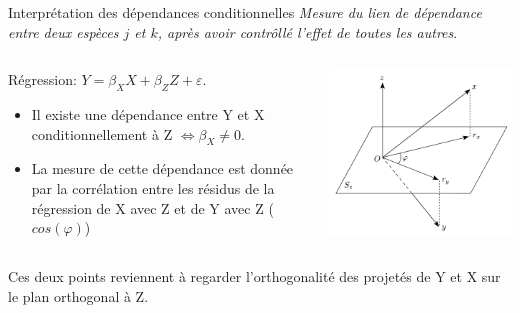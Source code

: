 \documentclass[11pt]{beamer}
\newcommand{\emphase}[1]{\textcolor{Complement}{#1}}
\newcommand{\bleu}[1]{\textcolor{Framableulight}{#1}}
\begin{document}
\begin{frame}{Interprétation des dépendances conditionnelles}
\textit{Mesure du lien de dépendance entre deux espèces $j$ et $k$, \emphase{après avoir contrôllé l'effet de toutes les autres}}.  \\
 \bigskip

\begin{columns}
\begin{column}{0.7\linewidth}
\bleu{Régression:} $Y=\beta_X X+\beta_Z Z+\varepsilon$.
\begin{itemize}
\item Il existe une dépendance entre Y et X conditionnellement à Z $\iff \beta_X \neq 0$.
\item La mesure de cette dépendance est donnée par la corrélation entre les résidus de la régression de X avec Z et de Y avec Z ($cos(\varphi)$)
\end{itemize}
\end{column}
\begin{column}{0.3\linewidth}
\includegraphics[width=\linewidth]{images/pcgeom.png}
\end{column}
\end{columns}
\bigskip

Ces deux points reviennent à regarder l'orthogonalité des projetés de Y et X sur le plan orthogonal à Z.
\end{frame}
\end{document}
